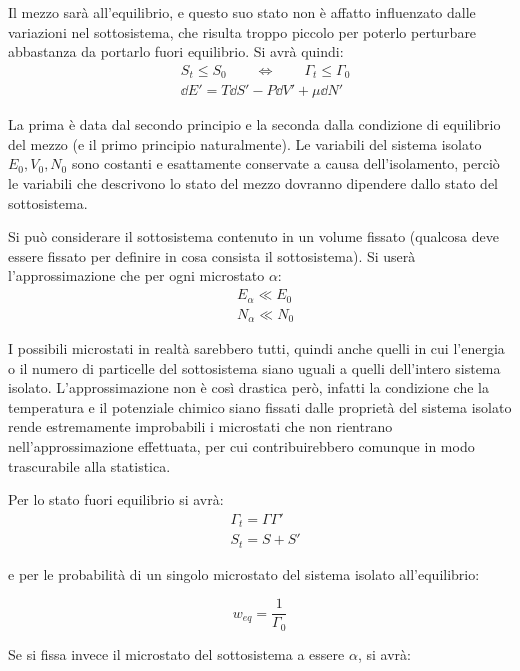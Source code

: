 Il mezzo sarà all'equilibrio, e questo suo stato non è affatto influenzato dalle variazioni nel sottosistema, che risulta troppo piccolo per poterlo perturbare abbastanza da portarlo fuori equilibrio.
Si avrà quindi:
\begin{align*}
&S_t \leq S_0	\qquad \iff \qquad	\Gamma_t \leq \Gamma_0\\
&\dd E' = T \dd S' - P \dd V' + \mu 	\dd N'
\end{align*}

\noindent La prima è data dal secondo principio e la seconda dalla condizione di equilibrio del mezzo (e il primo principio naturalmente). Le variabili del sistema isolato $E_0, V_0, N_0$ sono costanti e esattamente conservate a causa dell'isolamento, perciò le variabili che descrivono lo stato del mezzo dovranno dipendere dallo stato del sottosistema.

Si può considerare il sottosistema contenuto in un volume fissato (qualcosa deve essere fissato per definire in cosa consista il sottosistema). Si userà l'approssimazione che per ogni microstato $\alpha$:
\begin{align*}
&E_\alpha \ll E_0\\
&N_\alpha \ll N_0
\end{align*}

\noindent I possibili microstati in realtà sarebbero tutti, quindi anche quelli in cui l'energia o il numero di particelle del sottosistema siano uguali a quelli dell'intero sistema isolato. L'approssimazione non è così drastica però, infatti la condizione che la temperatura e il potenziale chimico siano fissati dalle proprietà del sistema isolato rende estremamente improbabili i microstati che non rientrano nell'approssimazione effettuata, per cui contribuirebbero comunque in modo trascurabile alla statistica.

Per lo stato fuori equilibrio si avrà:
\begin{align*}
&\Gamma_t = \Gamma \Gamma'\\
&S_t = S + S'
\end{align*}

\noindent e per le probabilità di un singolo microstato del sistema isolato all'equilibrio:

\begin{equation*}
w_{eq} = \frac{1}{\Gamma_0}
\end{equation*}

Se si fissa invece il microstato del sottosistema a essere $\alpha$, si avrà:

